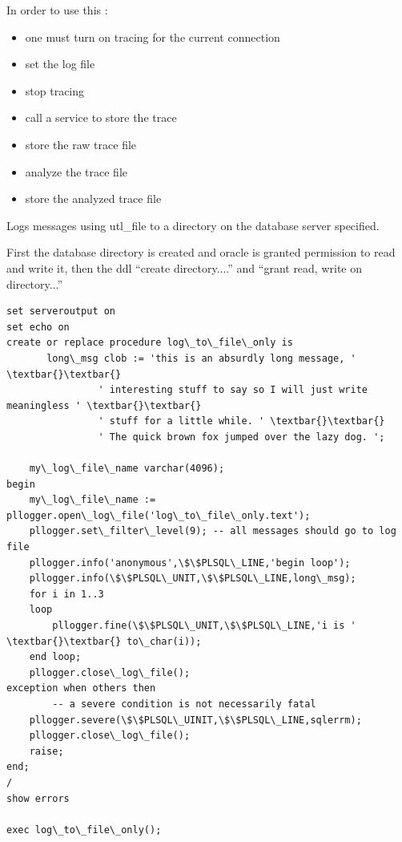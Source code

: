 \documentclass[letterpaper,10pt,english]{sphinxmanual}
\begin{document}
In order to use this :
\begin{itemize}
\item {} 
one must turn on tracing for the current connection

\item {} 
set the log file

\item {} 
stop tracing

\item {} 
call a service to store the trace

\item {} 
store the raw trace file

\item {} 
analyze the trace file

\item {} 
store the analyzed trace file

\end{itemize}

Logs messages using utl\_file to a directory on the database server
specified.

First the database directory is created and oracle is granted permission
to read and write it, then the ddl ``create directory....'' and ``grant
read, write on directory...''

\begin{Verbatim}[commandchars=\\\{\}]
set serveroutput on
set echo on
create or replace procedure log\_to\_file\_only is
       long\_msg clob := 'this is an absurdly long message, ' \textbar{}\textbar{}
                ' interesting stuff to say so I will just write meaningless ' \textbar{}\textbar{}
                ' stuff for a little while. ' \textbar{}\textbar{}
                ' The quick brown fox jumped over the lazy dog. ';

    my\_log\_file\_name varchar(4096);
begin
    my\_log\_file\_name := pllogger.open\_log\_file('log\_to\_file\_only.text');
    pllogger.set\_filter\_level(9); -- all messages should go to log file
    pllogger.info('anonymous',\$\$PLSQL\_LINE,'begin loop');
    pllogger.info(\$\$PLSQL\_UNIT,\$\$PLSQL\_LINE,long\_msg);
    for i in 1..3
    loop
        pllogger.fine(\$\$PLSQL\_UNIT,\$\$PLSQL\_LINE,'i is ' \textbar{}\textbar{} to\_char(i));
    end loop;
    pllogger.close\_log\_file();
exception when others then
        -- a severe condition is not necessarily fatal
    pllogger.severe(\$\$PLSQL\_UINIT,\$\$PLSQL\_LINE,sqlerrm);
    pllogger.close\_log\_file();
    raise;
end;
/
show errors

exec log\_to\_file\_only();
\end{Verbatim}
\end{document}
